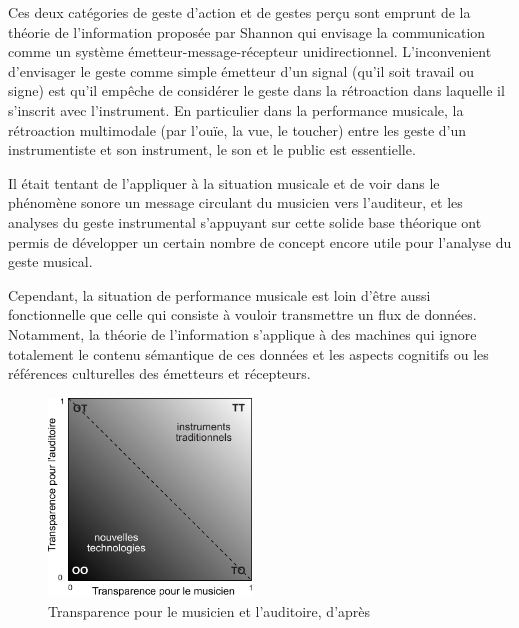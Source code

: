 Ces deux catégories de geste d'action et de gestes perçu sont emprunt de la théorie de l'information proposée par Shannon \cite{shannon_mathematical_1948} qui envisage la communication comme un système émetteur-message-récepteur unidirectionnel. 
L'inconvenient d'envisager le geste comme simple émetteur d'un signal (qu'il soit travail ou signe) est qu'il empêche de considérer le geste dans la rétroaction dans laquelle il s'inscrit avec l'instrument. En particulier dans la performance musicale, la rétroaction multimodale (par l'ouïe, la vue, le toucher) entre les geste d'un instrumentiste et son instrument, le son et le public est essentielle.

Il était tentant de l'appliquer à la situation musicale et de voir dans le phénomène sonore un message circulant du musicien vers l'auditeur, et les analyses du geste instrumental s'appuyant sur cette solide base théorique ont permis de développer un certain nombre de concept encore utile pour l'analyse du geste musical.

Cependant, la situation de performance musicale est loin d'être aussi fonctionnelle que celle qui consiste à vouloir transmettre un flux de données. Notamment, la théorie de l'information s'applique à des machines qui ignore totalement le contenu sémantique de ces données et les aspects cognitifs ou les références culturelles des émetteurs et récepteurs.
\begin{figure}
	\begin{center}
 		\includegraphics[width=0.48\textwidth]{gfx/03_gesture/Fels-transparency.pdf}
	\end{center}
	\caption{Transparence pour le musicien et l'auditoire, d'après \cite{fels_mapping_2002}}
	\label{fig:gesture:fels_transparency}
\end{figure}

